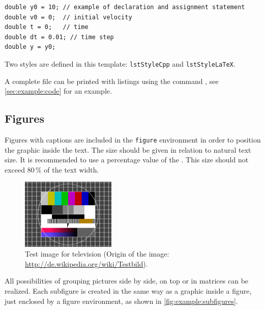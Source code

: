 \begin{lstlisting}
double y0 = 10; // example of declaration and assignment statement
double v0 = 0;  // initial velocity
double t = 0;   // time
double dt = 0.01; // time step
double y = y0;
\end{lstlisting}
%
Two styles are defined in this template: \texttt{lstStyleCpp} and \texttt{lstStyleLaTeX}.

A complete file can be printed with listings using the 
command , see \cref{sec:example:code} for an example.
\subsection{Figures}
\label{sec:example:figures}
%
Figures with captions are included in the \texttt{figure} environment in order to position the graphic inside the text. The size should be given in relation to natural text size. It is recommended to use a percentage value of the . This size should not exceed 80\,\%  of the text width.

\begin{figure}[htb]
  \centering
  \includegraphics[width=0.4\textwidth]{images/testimage.png}
  \caption[Test image for television]{Test image for television (Origin of the image: \url{http://de.wikipedia.org/wiki/Testbild}).}
  \label{fig:example:figure}
\end{figure}

All possibilities of grouping pictures side by side, on top or in matrices can be realized. Each subfigure is created in the same way as a graphic inside a figure, just enclosed by a figure environment, as shown in \cref{fig:example:subfigures}.

